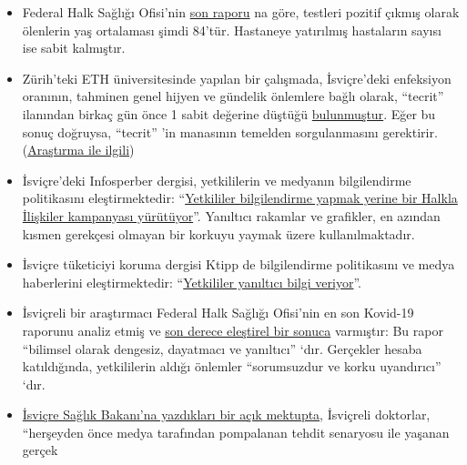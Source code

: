 \begin{itemize}
\tightlist
\item
  Federal Halk Sağlığı Ofisi'nin
  \href{https://www.bag.admin.ch/bag/de/home/krankheiten/ausbrueche-epidemien-pandemien/aktuelle-ausbrueche-epidemien/novel-cov/situation-schweiz-und-international.html}{son
  raporu} na göre, testleri pozitif çıkmış olarak ölenlerin yaş
  ortalaması şimdi 84'tür. Hastaneye yatırılmış hastaların sayısı ise
  sabit kalmıştır.
\item
  Zürih'teki ETH üniversitesinde yapılan bir çalışmada, İsviçre'deki
  enfeksiyon oranının, tahminen genel hijyen ve gündelik önlemlere bağlı
  olarak, ``tecrit'' ilanından birkaç gün önce 1 sabit değerine düştüğü
  \href{https://www.tagesanzeiger.ch/ansteckungsraten-flachten-bereits-vor-dem-lockdown-ab-809893127675}{bulunmuştur}.
  Eğer bu sonuç doğruysa, ``tecrit'' 'in manasının temelden
  sorgulanmasını gerektirir.
  (\href{https://bsse.ethz.ch/cevo/research/sars-cov-2/real-time-monitoring-in-switzerland.html}{Araştırma
  ile ilgili})
\item
  İsviçre'deki Infosperber dergisi, yetkililerin ve medyanın
  bilgilendirme politikasını eleştirmektedir:
  ``\href{https://www.infosperber.ch/Artikel/Gesundheit/Corona-Statt-zu-informieren-fuhren-Behorden-eine-PR-Kampagne}{Yetkililer
  bilgilendir}\href{https://www.infosperber.ch/Artikel/Gesundheit/Corona-Statt-zu-informieren-fuhren-Behorden-eine-PR-Kampagne}{me
  yapmak yerine bir Halkla İlişkiler kampanyası yürütüyor}''. Yanıltıcı
  rakamlar ve grafikler, en azından kısmen gerekçesi olmayan bir korkuyu
  yaymak üzere kullanılmaktadır.
\item
  İsviçre tüketiciyi koruma dergisi Ktipp de bilgilendirme politikasını
  ve medya haberlerini eleştirmektedir:
  ``\href{https://www.ktipp.ch/artikel/artikeldetail/behoerden-informieren-irrefuehrend/}{Yetkililer
  yanıltıcı bilgi veriyor}''.
\item
  İsviçreli bir araştırmacı Federal Halk Sağlığı Ofisi'nin en son
  Kovid-19 raporunu analiz etmiş ve
  \href{https://covid-19-fakten.blogspot.com/2020/04/die-analyse-des-aktuellen.html}{son
  derece eleştirel bir sonuca} varmıştır: Bu rapor ``bilimsel olarak
  dengesiz, dayatmacı ve yanıltıcı'' `dır. Gerçekler hesaba
  katıldığında, yetkililerin aldığı önlemler ``sorumsuzdur ve korku
  uyandırıcı'' `dır.
\item
  \href{https://www.rontalpraxis.ch/aktuelles}{İsviçre Sağlık Bakanı'na
  yazdıkları bir açık mektupta}, İsviçreli doktorlar, ``herşeyden önce
  medya tarafından pompalanan tehdit senaryosu ile yaşanan gerçek

\end{itemize}
